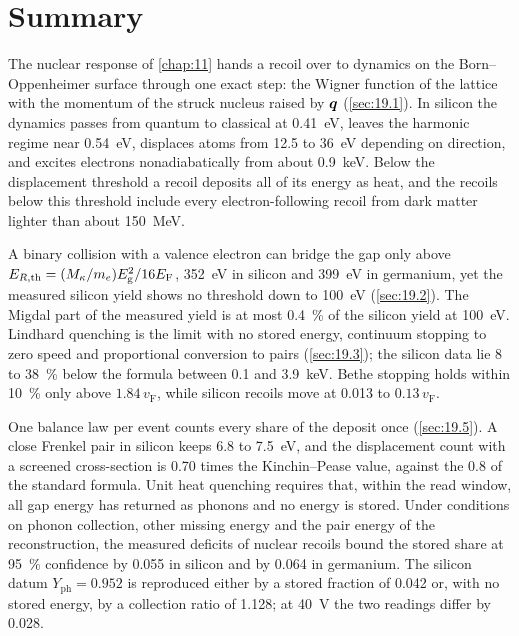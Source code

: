 \section*{Summary}

The nuclear response of \cref{chap:11} hands a recoil over to dynamics on the Born--Oppenheimer surface through one exact step: the Wigner function of the lattice with the momentum of the struck nucleus raised by $\bm{q}$ (\cref{sec:19.1}). In silicon the dynamics passes from quantum to classical at \SI{0.41}{eV}, leaves the harmonic regime near \SI{0.54}{eV}, displaces atoms from 12.5 to \SI{36}{eV} depending on direction, and excites electrons nonadiabatically from about \SI{0.9}{keV}. Below the displacement threshold a recoil deposits all of its energy as heat, and the recoils below this threshold include every electron-following recoil from dark matter lighter than about \SI{150}{MeV}.

A binary collision with a valence electron can bridge the gap only above $E_{R,\mathrm{th}} = (M_\kappa/m_e)E_{\mathrm{g}}^2/16E_{\mathrm{F}}$, \SI{352}{eV} in silicon and \SI{399}{eV} in germanium, yet the measured silicon yield shows no threshold down to \SI{100}{eV} (\cref{sec:19.2}). The Migdal part of the measured yield is at most \SI{0.4}{\percent} of the silicon yield at \SI{100}{eV}. Lindhard quenching is the limit with no stored energy, continuum stopping to zero speed and proportional conversion to pairs (\cref{sec:19.3}); the silicon data lie 8 to \SI{38}{\percent} below the formula between 0.1 and \SI{3.9}{keV}. Bethe stopping holds within \SI{10}{\percent} only above $1.84\,v_{\mathrm{F}}$, while silicon recoils move at 0.013 to $0.13\,v_{\mathrm{F}}$.

One balance law per event counts every share of the deposit once (\cref{sec:19.5}). A close Frenkel pair in silicon keeps 6.8 to \SI{7.5}{eV}, and the displacement count with a screened cross-section is 0.70 times the Kinchin--Pease value, against the 0.8 of the standard formula. Unit heat quenching requires that, within the read window, all gap energy has returned as phonons and no energy is stored. Under conditions on phonon collection, other missing energy and the pair energy of the reconstruction, the measured deficits of nuclear recoils bound the stored share at \SI{95}{\percent} confidence by 0.055 in silicon and by 0.064 in germanium. The silicon datum $Y_{\mathrm{ph}} = 0.952$ is reproduced either by a stored fraction of 0.042 or, with no stored energy, by a collection ratio of 1.128; at \SI{40}{V} the two readings differ by 0.028.

